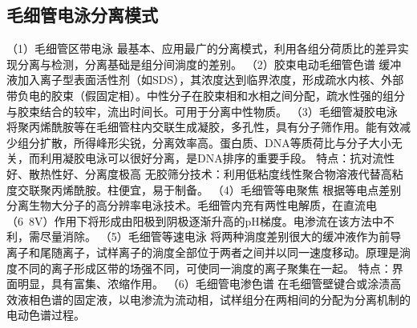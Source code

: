 \subsection{毛细管电泳分离模式}
（1）毛细管区带电泳
最基本、应用最广的分离模式，利用各组分荷质比的差异实现分离与检测，分离基础是组分间淌度的差别。
（2）胶束电动毛细管色谱
缓冲液加入离子型表面活性剂（如SDS），其浓度达到临界浓度，形成疏水内核、外部带负电的胶束（假固定相）。中性分子在胶束相和水相之间分配，疏水性强的组分与胶束结合的较牢，流出时间长。可用于分离中性物质。
（3）毛细管凝胶电泳
将聚丙烯酰胺等在毛细管柱内交联生成凝胶，多孔性，具有分子筛作用。能有效减少组分扩散，所得峰形尖锐，分离效率高。蛋白质、DNA等质荷比与分子大小无关，而利用凝胶电泳可以很好分离，是DNA排序的重要手段。
特点：抗对流性好、散热性好、分离度极高
无胶筛分技术：利用低粘度线性聚合物溶液代替高粘度交联聚丙烯酰胺。柱便宜，易于制备。
（4）毛细管等电聚焦
根据等电点差别分离生物大分子的高分辨率电泳技术。毛细管内充有两性电解质，在直流电（6~8V）作用下将形成由阳极到阴极逐渐升高的pH梯度。电渗流在该方法中不利，需尽量消除。
（5）毛细管等速电泳
将两种淌度差别很大的缓冲液作为前导离子和尾随离子，试样离子的淌度全部位于两者之间并以同一速度移动。原理是淌度不同的离子形成区带的场强不同，可使同一淌度的离子聚集在一起。
特点：界面明显，具有富集、浓缩作用。
（6）毛细管电渗色谱
在毛细管壁键合或涂渍高效液相色谱的固定液，以电渗流为流动相，试样组分在两相间的分配为分离机制的电动色谱过程。